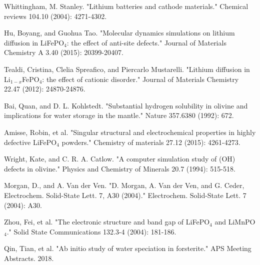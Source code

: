 \documentclass[11pt]{article}
\begin{document}
\begin{thebibliography}{9}
 Whittingham, M. Stanley. "Lithium batteries and cathode materials." Chemical reviews 104.10 (2004): 4271-4302.

 Hu, Boyang, and Guohua Tao. "Molecular dynamics simulations on lithium diffusion in LiFePO$_4$: the effect of anti-site defects." Journal of Materials Chemistry A 3.40 (2015): 20399-20407.

 Tealdi, Cristina, Clelia Spreafico, and Piercarlo Mustarelli. "Lithium diffusion in Li$_{1-x}$FePO$_4$: the effect of cationic disorder." Journal of Materials Chemistry 22.47 (2012): 24870-24876.

 Bai, Quan, and D. L. Kohlstedt. "Substantial hydrogen solubility in olivine and implications for water storage in the mantle." Nature 357.6380 (1992): 672.

 Amisse, Robin, et al. "Singular structural and electrochemical properties in highly defective LiFePO$_4$ powders." Chemistry of materials 27.12 (2015): 4261-4273.

 Wright, Kate, and C. R. A. Catlow. "A computer simulation study of (OH) defects in olivine." Physics and Chemistry of Minerals 20.7 (1994): 515-518.

 Morgan, D., and A. Van der Ven. "D. Morgan, A. Van der Ven, and G. Ceder, Electrochem. Solid-State Lett. 7, A30 (2004)." Electrochem. Solid-State Lett. 7 (2004): A30.

  Zhou, Fei, et al. "The electronic structure and band gap of LiFePO$_4$ and LiMnPO$_4$." Solid State Communications 132.3-4 (2004): 181-186.

 Qin, Tian, et al. "Ab initio study of water speciation in forsterite." APS Meeting Abstracts. 2018.
\end{thebibliography}
\end{document}
